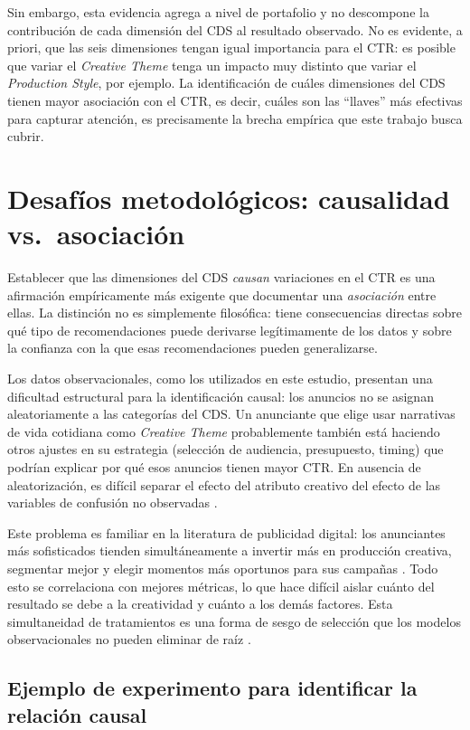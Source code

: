 \documentclass[12pt, a4paper]{report}
\begin{document}
Sin embargo, esta evidencia agrega a nivel de portafolio y no descompone la contribución de cada
dimensión del CDS al resultado observado. No es evidente, a priori, que las seis dimensiones tengan
igual importancia para el CTR: es posible que variar el \textit{Creative Theme} tenga un impacto
muy distinto que variar el \textit{Production Style}, por ejemplo. La identificación de cuáles
dimensiones del CDS tienen mayor asociación con el CTR, es decir, cuáles son las ``llaves'' más
efectivas para capturar atención, es precisamente la brecha empírica que este trabajo busca cubrir.

\section{Desafíos metodológicos: causalidad vs.\ asociación}

Establecer que las dimensiones del CDS \textit{causan} variaciones en el CTR es una afirmación
empíricamente más exigente que documentar una \textit{asociación} entre ellas. La distinción no es
simplemente filosófica: tiene consecuencias directas sobre qué tipo de recomendaciones puede derivarse
legítimamente de los datos y sobre la confianza con la que esas recomendaciones pueden generalizarse.

Los datos observacionales, como los utilizados en este estudio, presentan una dificultad estructural
para la identificación causal: los anuncios no se asignan aleatoriamente a las categorías del CDS.
Un anunciante que elige usar narrativas de vida cotidiana como \textit{Creative Theme} probablemente
también está haciendo otros ajustes en su estrategia (selección de audiencia, presupuesto,
timing) que podrían explicar por qué esos anuncios tienen mayor CTR. En ausencia de aleatorización,
es difícil separar el efecto del atributo creativo del efecto de las variables de confusión no
observadas \citep{cunningham2021}.

Este problema es familiar en la literatura de publicidad digital: los anunciantes más sofisticados
tienden simultáneamente a invertir más en producción creativa, segmentar mejor y elegir momentos
más oportunos para sus campañas \citep{yang2025}. Todo esto se correlaciona con mejores métricas,
lo que hace difícil aislar cuánto del resultado se debe a la creatividad y cuánto a los demás
factores. Esta simultaneidad de tratamientos es una forma de sesgo de selección que los modelos
observacionales no pueden eliminar de raíz \citep{cunningham2021}.

\subsection{Ejemplo de experimento para identificar la relación causal}
\end{document}
